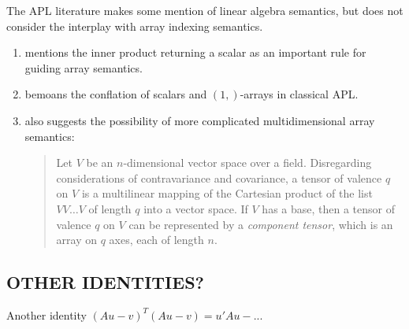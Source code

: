 The APL literature makes some mention of linear algebra semantics, but does not
consider the interplay with array indexing semantics.

\begin{enumerate}
\item \cite{More1973} mentions the inner product returning a scalar as an
	important rule for guiding array semantics.

\item \cite{Haegi1976} bemoans the conflation of scalars and $(1,)$-arrays in
	classical APL.

\item \cite[p. 153]{More1973} also suggests the possibility of more complicated
	multidimensional array semantics:

\begin{quote}
Let $V$ be an $n$-dimensional vector space over a field. Disregarding
considerations of contravariance and covariance, a tensor of valence $q$ on $V$
is a multilinear mapping of the Cartesian product of the list $V V \dots V$ of
length $q$ into a vector space. If $V$ has a base, then a tensor of valence $q$
on $V$ can be represented by a \textit{component tensor}, which is an array on
$q$ axes, each of length $n$.
\end{quote}

\end{enumerate}


\subsection{OTHER IDENTITIES?}
Another identity $(Au - v)^T(Au - v) = u'Au -...$
